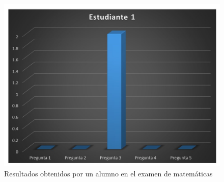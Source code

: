\documentclass[12pt] {report}
\begin{document}
\begin{figure}[H]
\centering 
\includegraphics[scale=.7]{MEstudiante1.JPG}
\caption{Resultados obtenidos por un alumno en el examen de matemáticas}
\end{figure}
\end{document}
